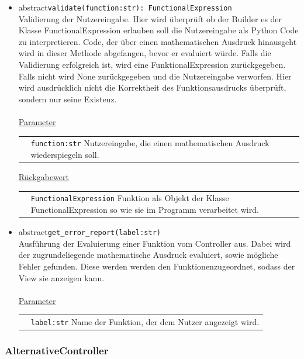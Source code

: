 \documentclass{article}
\begin{document}
\begin{itemize}
\item \flqq{}abstract\frqq \texttt{validate(function:str): FunctionalExpression}\\ Validierung der Nutzereingabe. Hier wird überprüft ob der Builder es der Klasse FunctionalExpression erlauben soll die Nutzereingabe als Python Code zu interpretieren. Code, der über einen mathematischen Ausdruck hinausgeht wird in dieser Methode abgefangen, bevor er evaluiert würde. Falls die Validierung erfolgreich ist, wird eine FunktionalExpression zurückgegeben. Falls nicht wird None zurückgegeben und die Nutzereingabe verworfen. Hier wird ausdrücklich nicht die Korrektheit des Funktionsausdrucks überprüft, sondern nur seine Existenz.\\\\
\underline{{Parameter}}\\
\begin{tabular}{lp{10.7cm}}
 & \texttt{function:str}  Nutzereingabe, die einen mathematischen Ausdruck wiederspiegeln soll. \\
\end{tabular}
\newline\newline
\underline{{Rückgabewert}}\\
\begin{tabular}{lp{10.7cm}}
 & \texttt{FunctionalExpression} Funktion als Objekt der Klasse FunctionalExpression so wie sie im Programm verarbeitet wird. \\
\end{tabular}


\item \flqq{}abstract\frqq \texttt{get\_error\_report(label:str)}\\ Ausführung der Evaluierung einer Funktion vom Controller aus. Dabei wird der zugrundeliegende mathematische Ausdruck evaluiert, sowie mögliche Fehler gefunden. Diese werden werden den Funktionenzugeordnet, sodass der View sie anzeigen kann. \\\\
\underline{{Parameter}}\\
\begin{tabular}{lp{10.7cm}}
 & \texttt{label:str} Name der Funktion, der dem Nutzer angezeigt wird. \\
\end{tabular}
\end{itemize}


\newpage
\subsubsection*{\large{\textbf{AlternativeController}\label{cls:AlternativeController}}}\normalsize
\end{document}
